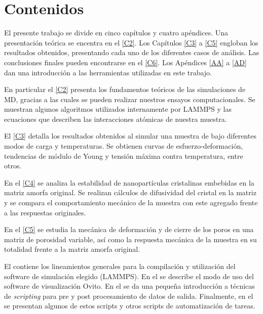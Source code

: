 
\section{Contenidos}
\label{S1_6}

El presente trabajo se divide en cinco capítulos y cuatro apéndices. Una presentación teórica se encentra en el \cref{C2}. Los Capítulos \ref{C3} a \ref{C5} engloban los resultados obtenidos, presentando cada uno de los diferentes casos de análisis. Las conclusiones finales pueden encontrarse en el \cref{C6}. Los Apéndices \ref{AA} a \ref{AD} dan una introducción a las herramientas utilizadas en este trabajo.

En particular el \cref{C2} presenta los fundamentos teóricos de las simulaciones de MD, gracias a las cuales se pueden realizar nuestros ensayos computacionales. Se muestran algunos algoritmos utilizados internamente por LAMMPS y las ecuaciones que describen las interacciones atómicas de nuestra muestra.

El \cref{C3} detalla los resultados obtenidos al simular una muestra de \CuZr bajo diferentes modos de carga y temperaturas. Se obtienen curvas de esfuerzo-deformación, tendencias de módulo de Young y tensión máxima contra temperatura, entre otros.

En el \cref{C4} se analiza la estabilidad de nanopartículas cristalinas embebidas en la matriz amorfa original. Se realizan cálculos de difusividad del cristal en la matriz y se compara el comportamiento mecánico de la muestra con este agregado frente a las respuestas originales.

En el \cref{C5} se estudia la mecánica de deformación y de cierre de los poros en una matriz de porosidad variable, así como la respuesta mecánica de la muestra en su totalidad frente a la matriz amorfa original. 

El  contiene los lineamientos generales para la compilación y utilización del software de simulación elegido (LAMMPS). En el  se describe el modo de uso del software de visualización Ovito. En el  se da una pequeña introducción a técnicas de \textit{scripting} para pre y post procesamiento de datos de salida. Finalmente, en el  se presentan algunos de estos scripts y otros scripts de automatización de tareas.